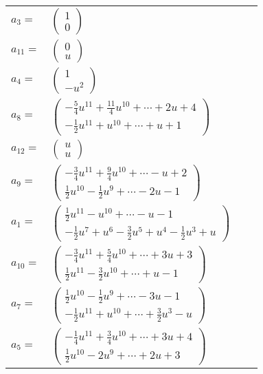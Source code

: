 \documentclass[1p]{elsarticle_modified}
\theoremstyle{definition}
\begin{document}
\begin{tabular}{m{7pt} m{180pt} m{7pt} m{180pt} }
\flushright $a_{3}=$&$\begin{pmatrix}1\\0\end{pmatrix}$ \\
\flushright $a_{11}=$&$\begin{pmatrix}0\\u\end{pmatrix}$ \\
\flushright $a_{4}=$&$\begin{pmatrix}1\\- u^2\end{pmatrix}$ \\
\flushright $a_{8}=$&$\begin{pmatrix}-\frac{5}{4} u^{11}+\frac{11}{4} u^{10}+\cdots+2 u+4\\-\frac{1}{2} u^{11}+u^{10}+\cdots+u+1\end{pmatrix}$ \\
\flushright $a_{12}=$&$\begin{pmatrix}u\\u\end{pmatrix}$ \\
\flushright $a_{9}=$&$\begin{pmatrix}-\frac{3}{4} u^{11}+\frac{9}{4} u^{10}+\cdots- u+2\\\frac{1}{2} u^{10}-\frac{1}{2} u^9+\cdots-2 u-1\end{pmatrix}$ \\
\flushright $a_{1}=$&$\begin{pmatrix}\frac{1}{2} u^{11}- u^{10}+\cdots- u-1\\-\frac{1}{2} u^7+u^6-\frac{3}{2} u^5+u^4-\frac{1}{2} u^3+u\end{pmatrix}$ \\
\flushright $a_{10}=$&$\begin{pmatrix}-\frac{3}{4} u^{11}+\frac{5}{4} u^{10}+\cdots+3 u+3\\\frac{1}{2} u^{11}-\frac{3}{2} u^{10}+\cdots+u-1\end{pmatrix}$ \\
\flushright $a_{7}=$&$\begin{pmatrix}\frac{1}{2} u^{10}-\frac{1}{2} u^9+\cdots-3 u-1\\-\frac{1}{2} u^{11}+u^{10}+\cdots+\frac{3}{2} u^3- u\end{pmatrix}$ \\
\flushright $a_{5}=$&$\begin{pmatrix}-\frac{1}{4} u^{11}+\frac{3}{4} u^{10}+\cdots+3 u+4\\\frac{1}{2} u^{10}-2 u^9+\cdots+2 u+3\end{pmatrix}$ \\

\end{tabular}
\end{document}
